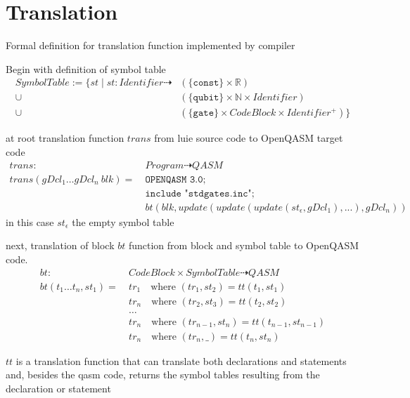 \section{Translation}
\label{sec:concept_translation}
Formal definition for translation function implemented by compiler

Begin with definition of symbol table
\begin{align*}
    SymbolTable := \{st \mid st : Identifier \dashrightarrow &(\{\texttt{const}\} \times \mathbb{R})\\
                                                    \cup    &(\{\texttt{qubit}\} \times \mathbb{N} \times Identifier)\\
                                                    \cup    &(\{\texttt{gate}\} \times CodeBlock \times Identifier^+)
                                                    \}
\end{align*}

at root translation function $trans$ from luie source code to OpenQASM target code
\begin{align*}
    trans : \ & Program \dashrightarrow QASM\\
    trans(gDcl_1 \dots gDcl_n \ blk) = \ & \texttt{OPENQASM 3.0;}\\
                & \texttt{include "stdgates.inc";}\\
                & bt(blk, update(update(update(st_\epsilon, gDcl_1), ...), gDcl_n))
\end{align*}  
in this case $st_\epsilon$ the empty symbol table

next, translation of block $bt$ function from block and symbol table to OpenQASM code.  
\begin{align*}
    bt : \ & CodeBlock \times SymbolTable \dashrightarrow QASM\\
    bt(t_1 \dots t_n, st_1) = \ &  tr_1 \quad \text{where } (tr_1, st_2) = tt(t_1, st_1)\\
    & tr_n \quad \text{where } (tr_2, st_3) = tt(t_2, st_2)\\
    & \dots\\
    & tr_n \quad \text{where } (tr_{n - 1}, st_n) = tt(t_{n - 1}, st_{n - 1})\\
    & tr_n \quad \text{where } (tr_n, \_) = tt(t_n, st_n)
\end{align*}

$tt$ is a translation function that can translate both declarations and statements and, besides the qasm code, returns the symbol tables resulting from the declaration or statement

